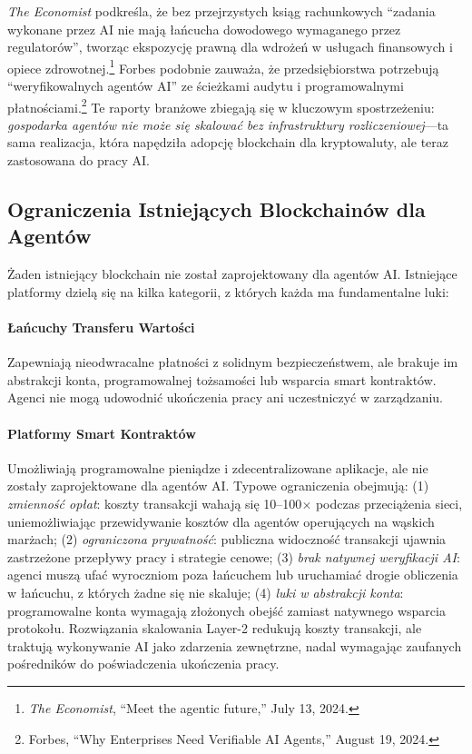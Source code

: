 \documentclass[11pt]{article}
\begin{document}
\emph{The Economist} podkreśla, że bez przejrzystych ksiąg rachunkowych ``zadania wykonane przez AI nie mają łańcucha dowodowego wymaganego przez regulatorów'', tworząc ekspozycję prawną dla wdrożeń w usługach finansowych i opiece zdrowotnej.\footnote{\emph{The Economist}, ``Meet the agentic future,'' July 13, 2024.} Forbes podobnie zauważa, że przedsiębiorstwa potrzebują ``weryfikowalnych agentów AI'' ze ścieżkami audytu i programowalnymi płatnościami.\footnote{Forbes, ``Why Enterprises Need Verifiable AI Agents,'' August 19, 2024.} Te raporty branżowe zbiegają się w kluczowym spostrzeżeniu: \emph{gospodarka agentów nie może się skalować bez infrastruktury rozliczeniowej}---ta sama realizacja, która napędziła adopcję blockchain dla kryptowaluty, ale teraz zastosowana do pracy AI.

\subsection{Ograniczenia Istniejących Blockchainów dla Agentów}
Żaden istniejący blockchain nie został zaprojektowany dla agentów AI. Istniejące platformy dzielą się na kilka kategorii, z których każda ma fundamentalne luki:

\paragraph{Łańcuchy Transferu Wartości} Zapewniają nieodwracalne płatności z solidnym bezpieczeństwem, ale brakuje im abstrakcji konta, programowalnej tożsamości lub wsparcia smart kontraktów. Agenci nie mogą udowodnić ukończenia pracy ani uczestniczyć w zarządzaniu.

\paragraph{Platformy Smart Kontraktów} Umożliwiają programowalne pieniądze i zdecentralizowane aplikacje, ale nie zostały zaprojektowane dla agentów AI. Typowe ograniczenia obejmują: (1) \emph{zmienność opłat}: koszty transakcji wahają się 10--100$\times$ podczas przeciążenia sieci, uniemożliwiając przewidywanie kosztów dla agentów operujących na wąskich marżach; (2) \emph{ograniczona prywatność}: publiczna widoczność transakcji ujawnia zastrzeżone przepływy pracy i strategie cenowe; (3) \emph{brak natywnej weryfikacji AI}: agenci muszą ufać wyroczniom poza łańcuchem lub uruchamiać drogie obliczenia w łańcuchu, z których żadne się nie skaluje; (4) \emph{luki w abstrakcji konta}: programowalne konta wymagają złożonych obejść zamiast natywnego wsparcia protokołu. Rozwiązania skalowania Layer-2 redukują koszty transakcji, ale traktują wykonywanie AI jako zdarzenia zewnętrzne, nadal wymagając zaufanych pośredników do poświadczenia ukończenia pracy.
\end{document}
